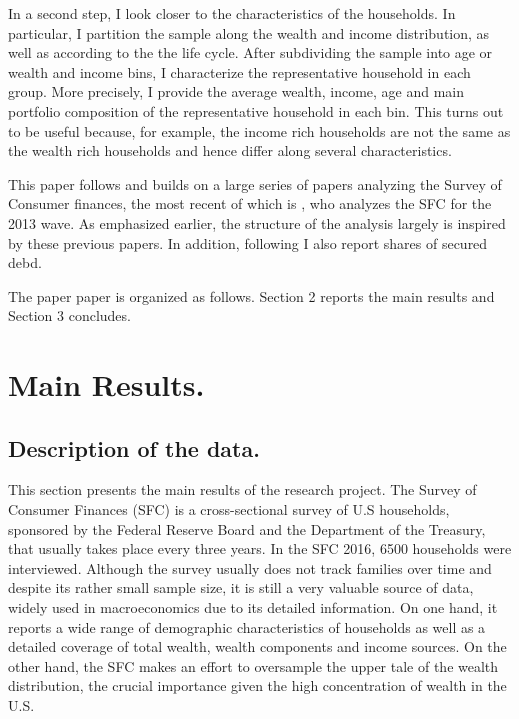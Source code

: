\documentclass[11pt, a4paper, leqno]{article}
\begin{document}
    In a second step, I look closer to the characteristics of the households. In particular, I partition the sample along the wealth and income distribution, as well as according to the the life cycle. After subdividing the sample into age or wealth and income bins, I characterize the representative household in each group. More precisely, I provide the average wealth, income, age and main portfolio composition of the representative household in each bin. This turns out to be useful because, for example, the income rich households are not the same as the wealth rich households and hence differ along several characteristics. 

    This paper follows and builds on a large series of papers analyzing the Survey of Consumer finances, the most recent of which is \citet{Kuhn2016}, who analyzes the SFC for the 2013 wave. As emphasized earlier, the structure of the analysis largely is inspired by these previous papers. In addition, following \citet{Hintermaier2016} I also report shares of secured debd.

    The paper paper is organized as follows. Section 2 reports the main results and Section 3 concludes.


\section{Main Results.}
\label{sec:mainresults}

\subsection*{Description of the data.}

This section presents the main results of the research project. The Survey of Consumer Finances (SFC) is a cross-sectional survey of U.S households, sponsored by the Federal Reserve Board and the Department of the Treasury, that usually takes place every three years. In the SFC 2016, 6500 households were interviewed. Although the survey usually does not track families over time and despite its rather small sample size, it is still a very valuable source of data, widely used in macroeconomics due to its detailed information. On one hand, it reports a wide range of demographic characteristics of households as well as a detailed coverage of total wealth, wealth components and income sources. On the other hand, the SFC makes an effort to oversample the upper tale of the wealth distribution, the crucial importance given the high concentration of wealth in the U.S. 
\end{document}
